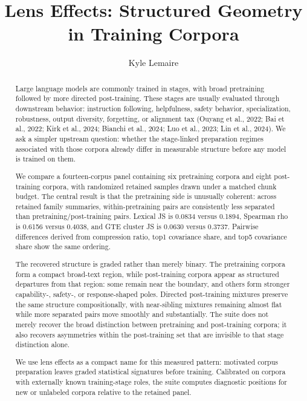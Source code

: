 \documentclass[11pt]{article}
\title{Lens Effects: Structured Geometry in Training Corpora}
\author{Kyle Lemaire}
\date{}
\begin{document}
\maketitle

\begin{abstract}
\setlength{\parskip}{0.45em}
Large language models are commonly trained in stages, with broad pretraining followed by more directed post-training. These stages are usually evaluated through downstream behavior: instruction following, helpfulness, safety behavior, specialization, robustness, output diversity, forgetting, or alignment tax (Ouyang et al., 2022; Bai et al., 2022; Kirk et al., 2024; Bianchi et al., 2024; Luo et al., 2023; Lin et al., 2024). We ask a simpler upstream question: whether the stage-linked preparation regimes associated with those corpora already differ in measurable structure before any model is trained on them.

We compare a fourteen-corpus panel containing six pretraining corpora and eight post-training corpora, with randomized retained samples drawn under a matched chunk budget. The central result is that the pretraining side is unusually coherent: across retained family summaries, within-pretraining pairs are consistently less separated than pretraining/post-training pairs. Lexical JS is 0.0834 versus 0.1894, Spearman rho is 0.6156 versus 0.4038, and GTE cluster JS is 0.0630 versus 0.3737. Pairwise differences derived from compression ratio, top1 covariance share, and top5 covariance share show the same ordering.

The recovered structure is graded rather than merely binary. The pretraining corpora form a compact broad-text region, while post-training corpora appear as structured departures from that region: some remain near the boundary, and others form stronger capability-, safety-, or response-shaped poles. Directed post-training mixtures preserve the same structure compositionally, with near-sibling mixtures remaining almost flat while more separated pairs move smoothly and substantially. The suite does not merely recover the broad distinction between pretraining and post-training corpora; it also recovers asymmetries within the post-training set that are invisible to that stage distinction alone.

We use lens effects as a compact name for this measured pattern: motivated corpus preparation leaves graded statistical signatures before training. Calibrated on corpora with externally known training-stage roles, the suite computes diagnostic positions for new or unlabeled corpora relative to the retained panel.

\end{abstract}
\end{document}
